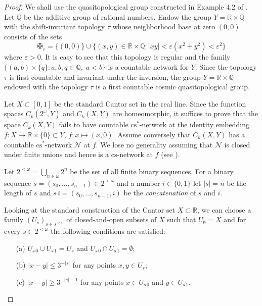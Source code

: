 \documentclass{amsart}
\theoremstyle{definition}
\begin{document}
\begin{proof} We shall use the quasitopological group constructed in Example 4.2 of \cite{Ban}.
Let ${\mathbb Q}$ be the additive group of rational numbers. Endow the group $Y={\mathbb R}\times{\mathbb Q}$ with the shift-invariant topology $\tau$ whose neighborhood base at zero $(0,0)$ consists of the sets
$$\maltese_{\varepsilon}=\{(0,0)\}\cup\{(x,y)\in{\mathbb R}\times{\mathbb Q}:|xy|<{\varepsilon}(x^2+y^2)<{\varepsilon}^2\}$$
where ${\varepsilon}>0$. It is easy to see that this topology is regular and the family $\{(a,b)\times\{q\}\colon a,b,q\in{\mathbb Q},\;a<b\}$ is a countable network for $Y$. Since the topology $\tau$ is first countable and invariant under the inversion, the group $Y={\mathbb R}\times{\mathbb Q}$ endowed with the topology $\tau$ is a first countable cosmic quasitopological group.

Let $X\subset [0,1]$ be the standard Cantor set in the real line. Since the function spaces $C_k(2^{\omega},Y)$ and $C_k(X,Y)$ are homeomorphic, it suffices to prove that the space $C_k(X,Y)$ fails to have countable ${\mathrm{cs}}^*$-network at the identity embedding $f:X\to {\mathbb R}\times\{0\}\subset Y$, $f:x\mapsto (x,0)$. Assume conversely that $C_k(X,Y)$ has a countable ${\mathrm{cs}}^*$-network $\mathcal N$ at $f$. We lose no generality assuming that $\mathcal N$ is closed under finite unions and hence is a ${\mathrm{cs}}$-network at $f$ (see \cite{BZd}).

Let $2^{<{\omega}}=\bigcup_{n\in{\omega}}2^n$ be the set of all finite binary sequences. For a binary sequence $s=(s_0,\dots,s_{n-1})\in 2^{<{\omega}}$ and a number $i\in\{0,1\}$ let $|s|=n$ be the length of $s$ and  $s\hat{\,}i=(s_0,\dots,s_{n-1},i)$ be the {\em concatenation} of $s$ and $i$.

Looking at the standard construction of the Cantor set $X\subset{\mathbb R}$, we can choose a family $(U_s)_{s\in s^{<{\omega}}}$ of closed-and-open subsets of $X$ such that $U_\emptyset=X$ and for every $s\in 2^{<{\omega}}$ the following conditions are satisfied:
\begin{itemize}
\item[(a)] $U_{s\hat{\,}0}\cup U_{s\hat{\,}1}=U_s$ and $U_{s\hat{\,}0}\cap U_{s\hat{\,}1}=\emptyset$;
\item[(b)] $|x-y|\le 3^{-|s|}$ for any points $x,y\in U_s$;
\item[(c)] $|x-y|\ge 3^{-|s|-1}$ for any points $x\in U_{s\hat{\,}0}$ and $y\in U_{s\hat{\,}1}$.
\end{itemize}


\end{proof}
\end{document}
